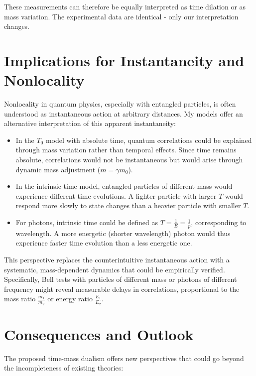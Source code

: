 \documentclass[a4paper,12pt]{article}
\begin{document}
	These measurements can therefore be equally interpreted as time dilation or as mass variation. The experimental data are identical - only our interpretation changes.
	
	\section{Implications for Instantaneity and Nonlocality}
	
	Nonlocality in quantum physics, especially with entangled particles, is often understood as instantaneous action at arbitrary distances. My models offer an alternative interpretation of this apparent instantaneity:
	
	\begin{itemize}
		\item In the $T_0$ model with absolute time, quantum correlations could be explained through mass variation rather than temporal effects. Since time remains absolute, correlations would not be instantaneous but would arise through dynamic mass adjustment ($m = \gamma m_0$).
		
		\item In the intrinsic time model, entangled particles of different mass would experience different time evolutions. A lighter particle with larger $T$ would respond more slowly to state changes than a heavier particle with smaller $T$.
		
		\item For photons, intrinsic time could be defined as $T = \frac{1}{E} = \frac{1}{p}$, corresponding to wavelength. A more energetic (shorter wavelength) photon would thus experience faster time evolution than a less energetic one.
	\end{itemize}
	
	This perspective replaces the counterintuitive instantaneous action with a systematic, mass-dependent dynamics that could be empirically verified. Specifically, Bell tests with particles of different mass or photons of different frequency might reveal measurable delays in correlations, proportional to the mass ratio $\frac{m_1}{m_2}$ or energy ratio $\frac{E_1}{E_2}$.
	
	\section{Consequences and Outlook}
	
	The proposed time-mass dualism offers new perspectives that could go beyond the incompleteness of existing theories:
	
\end{document}
